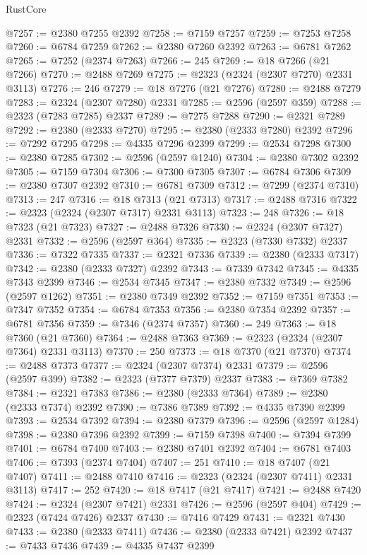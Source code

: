 \begin{lexlean}{RustCore}
\begin{coremodule}
@7257 := @2380 @7255 @2392
@7258 := @7159 @7257
@7259 := @7253 @7258
@7260 := @6784 @7259
@7262 := @2380 @7260 @2392
@7263 := @6781 @7262
@7265 := @7252 (@2374 @7263)
@7266 := 245
@7269 := @18 @7266 (@21 @7266)
@7270 := @2488 @7269
@7275 := @2323 (@2324 (@2307 @7270) @2331 @3113)
@7276 := 246
@7279 := @18 @7276 (@21 @7276)
@7280 := @2488 @7279
@7283 := @2324 (@2307 @7280) @2331
@7285 := @2596 (@2597 @359)
@7288 := @2323 (@7283 @7285) @2337
@7289 := @7275 @7288
@7290 := @2321 @7289
@7292 := @2380 (@2333 @7270)
@7295 := @2380 (@2333 @7280) @2392
@7296 := @7292 @7295
@7298 := @4335 @7296 @2399
@7299 := @2534 @7298
@7300 := @2380 @7285
@7302 := @2596 (@2597 @1240)
@7304 := @2380 @7302 @2392
@7305 := @7159 @7304
@7306 := @7300 @7305
@7307 := @6784 @7306
@7309 := @2380 @7307 @2392
@7310 := @6781 @7309
@7312 := @7299 (@2374 @7310)
@7313 := 247
@7316 := @18 @7313 (@21 @7313)
@7317 := @2488 @7316
@7322 := @2323 (@2324 (@2307 @7317) @2331 @3113)
@7323 := 248
@7326 := @18 @7323 (@21 @7323)
@7327 := @2488 @7326
@7330 := @2324 (@2307 @7327) @2331
@7332 := @2596 (@2597 @364)
@7335 := @2323 (@7330 @7332) @2337
@7336 := @7322 @7335
@7337 := @2321 @7336
@7339 := @2380 (@2333 @7317)
@7342 := @2380 (@2333 @7327) @2392
@7343 := @7339 @7342
@7345 := @4335 @7343 @2399
@7346 := @2534 @7345
@7347 := @2380 @7332
@7349 := @2596 (@2597 @1262)
@7351 := @2380 @7349 @2392
@7352 := @7159 @7351
@7353 := @7347 @7352
@7354 := @6784 @7353
@7356 := @2380 @7354 @2392
@7357 := @6781 @7356
@7359 := @7346 (@2374 @7357)
@7360 := 249
@7363 := @18 @7360 (@21 @7360)
@7364 := @2488 @7363
@7369 := @2323 (@2324 (@2307 @7364) @2331 @3113)
@7370 := 250
@7373 := @18 @7370 (@21 @7370)
@7374 := @2488 @7373
@7377 := @2324 (@2307 @7374) @2331
@7379 := @2596 (@2597 @399)
@7382 := @2323 (@7377 @7379) @2337
@7383 := @7369 @7382
@7384 := @2321 @7383
@7386 := @2380 (@2333 @7364)
@7389 := @2380 (@2333 @7374) @2392
@7390 := @7386 @7389
@7392 := @4335 @7390 @2399
@7393 := @2534 @7392
@7394 := @2380 @7379
@7396 := @2596 (@2597 @1284)
@7398 := @2380 @7396 @2392
@7399 := @7159 @7398
@7400 := @7394 @7399
@7401 := @6784 @7400
@7403 := @2380 @7401 @2392
@7404 := @6781 @7403
@7406 := @7393 (@2374 @7404)
@7407 := 251
@7410 := @18 @7407 (@21 @7407)
@7411 := @2488 @7410
@7416 := @2323 (@2324 (@2307 @7411) @2331 @3113)
@7417 := 252
@7420 := @18 @7417 (@21 @7417)
@7421 := @2488 @7420
@7424 := @2324 (@2307 @7421) @2331
@7426 := @2596 (@2597 @404)
@7429 := @2323 (@7424 @7426) @2337
@7430 := @7416 @7429
@7431 := @2321 @7430
@7433 := @2380 (@2333 @7411)
@7436 := @2380 (@2333 @7421) @2392
@7437 := @7433 @7436
@7439 := @4335 @7437 @2399

\end{coremodule}
\end{lexlean}
